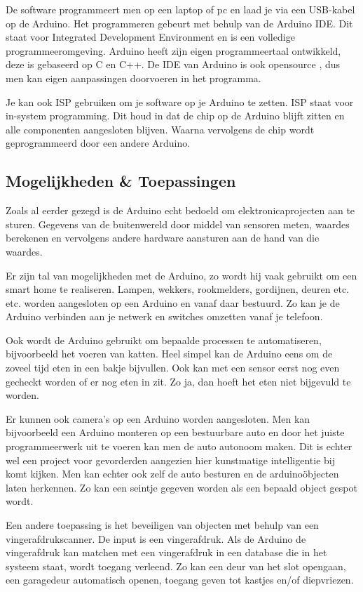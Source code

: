 \documentclass[a4paper, dutch, abstract=true]{scrartcl}
\begin{document}
De software programmeert men op een laptop of pc en laad je via een USB-kabel op de Arduino.
Het programmeren gebeurt met behulp van de Arduino IDE.
Dit staat voor Integrated Development Environment en is een volledige programmeeromgeving.
Arduino heeft zijn eigen programmeertaal ontwikkeld, deze is gebaseerd op C en C++.
De IDE van Arduino is ook opensource \cite{arduino2019github}, dus men kan eigen aanpassingen
doorvoeren in het programma.

Je kan ook ISP gebruiken om je software op je Arduino te zetten.
ISP staat voor in-system programming.
Dit houd in dat de chip op de Arduino blijft zitten en alle componenten aangesloten blijven.
Waarna vervolgens de chip wordt geprogrammeerd door een andere Arduino.

\subsection{Mogelijkheden \& Toepassingen}
Zoals al eerder gezegd is de Arduino echt bedoeld om elektronicaprojecten aan te sturen.
Gegevens van de buitenwereld door middel van sensoren meten, waardes berekenen en vervolgens andere
hardware aansturen aan de hand van die waardes.

Er zijn tal van mogelijkheden met de Arduino, zo wordt hij vaak gebruikt om een smart home te
realiseren.
Lampen, wekkers, rookmelders, gordijnen, deuren etc. etc. worden aangesloten op een Arduino en vanaf
daar bestuurd.
Zo kan je de Arduino verbinden aan je netwerk en switches omzetten vanaf je telefoon.

Ook wordt de Arduino gebruikt om bepaalde processen te automatiseren, bijvoorbeeld het voeren van
katten.
Heel simpel kan de Arduino eens om de zoveel tijd eten in een bakje bijvullen.
Ook kan met een sensor eerst nog even gecheckt worden of er nog eten in zit.
Zo ja, dan hoeft het eten niet bijgevuld te worden.

Er kunnen ook camera's op een Arduino worden aangesloten.
Men kan bijvoorbeeld een Arduino monteren op een bestuurbare auto en door het juiste programmeerwerk
uit te voeren kan men de auto autonoom maken.
Dit is echter wel een project voor gevorderden aangezien hier kunstmatige intelligentie bij komt
kijken.
Men kan echter ook zelf de auto besturen en de arduino{\"o}bjecten laten herkennen.
Zo kan een seintje gegeven worden als een bepaald object gespot wordt.

Een andere toepassing is het beveiligen van objecten met behulp van een vingerafdrukscanner.
De input is een vingerafdruk.
Als de Arduino de vingerafdruk kan matchen met een vingerafdruk in een database die in het systeem
staat, wordt toegang verleend.
Zo kan een deur van het slot opengaan, een garagedeur automatisch openen, toegang geven tot kastjes
en/of diepvriezen.
\end{document}
